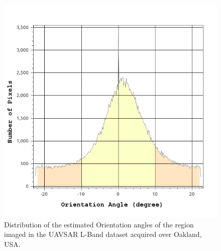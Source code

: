\begin{figure} [!htb]
	\centering
	\includegraphics[width = 0.45\columnwidth]{Figures/Trento/orientation_RS2}
	\caption[PolSAR data preprocessing]{Distribution of the estimated Orientation angles of the region imaged in the UAVSAR L-Band dataset acquired over Oakland, USA.}
	\label{fig:orientationHist}
\end{figure} 
%
